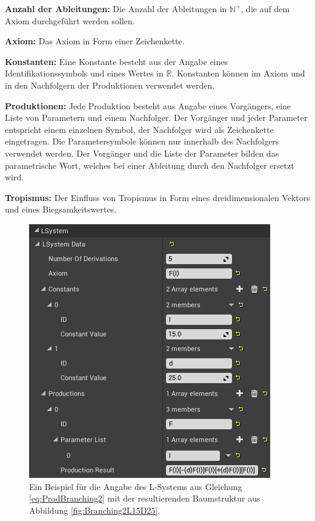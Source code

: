 \begin{description}
	\item \textbf{Anzahl der Ableitungen:} Die Anzahl der Ableitungen in $\mathbb{N}^+$, die auf dem Axiom durchgeführt werden sollen. \\
	
	\item \textbf{Axiom:} Das Axiom in Form einer Zeichenkette. \\
	
	\item \textbf{Konstanten:} Eine Konstante besteht aus der Angabe eines Identifikationssymbols und eines Wertes in $\mathbb{R}$. Konstanten können im Axiom und in den Nachfolgern der Produktionen verwendet werden.\\	
	
	\item \textbf{Produktionen:} Jede Produktion besteht aus Angabe eines Vorgängers, eine Liste von Parametern und einem Nachfolger. Der Vorgänger und jeder Parameter entspricht einem einzelnen Symbol, der Nachfolger wird als Zeichenkette eingetragen. Die Parametersymbole können nur innerhalb des Nachfolgers verwendet werden. Der Vorgänger und die Liste der Parameter bilden das parametrische Wort, welches bei einer Ableitung durch den Nachfolger ersetzt wird. \\
	
	\item \textbf{Tropismus:} Der Einfluss von Tropismus in Form eines dreidimensionalen Vektors und eines Biegsamkeitswertes.
\end{description}
\begin{figure} [hbtp]
	\centering
	\includegraphics[height=0.4\textheight]{images/LS_ExampleUE4UI.png}
	\caption{Ein Beispiel für die Angabe des L-Systems aus Gleichung \ref{eq:ProdBranching2} mit der resultierenden Baumstruktur aus Abbildung \ref{fig:Branching2L15D25}.}
	\label{fig:LS_ExampleUE4UI}
\end{figure}

